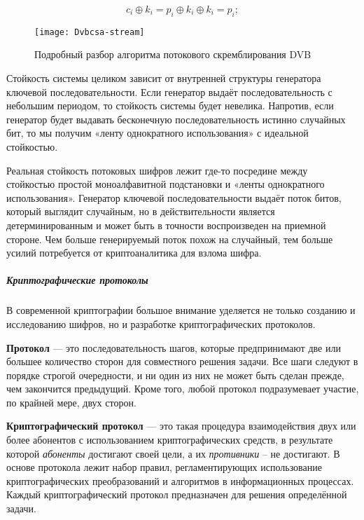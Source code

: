 \begin{equation}\label{potocShifr}
c_i \oplus k_i =p_i \oplus k_i \oplus k_i=p_i;
\end{equation}

\begin{figure}[!ht]
  \centering
  \texttt{[image: Dvbcsa-stream]}
  \caption{Подробный разбор алгоритма потокового скремблирования DVB }\label{Dvbcsa_stream}
\end{figure}
Стойкость системы целиком зависит от внутренней структуры генератора ключевой
последовательности. Если генератор выдаёт последовательность с небольшим
периодом, то стойкость системы будет невелика. Напротив, если генератор будет
выдавать бесконечную последовательность истинно случайных бит, то мы получим
«ленту однократного использования» с идеальной стойкостью.

Реальная стойкость потоковых шифров лежит где-то посредине между стойкостью
простой моноалфавитной подстановки и «ленты однократного использования».
Генератор ключевой последовательности выдаёт поток битов, который выглядит
случайным, но в действительности является детерминированным и может быть в
точности воспроизведен на приемной стороне. Чем больше генерируемый поток
похож на случайный, тем больше усилий потребуется от криптоаналитика для
взлома шифра.

\subparagraph{Криптографические протоколы} %
В современной криптографии большое внимание уделяется не только созданию и
исследованию шифров, но и разработке криптографических протоколов.

\textbf{Протокол} --- это последовательность шагов, которые предпринимают две
или большее количество сторон для совместного решения задачи. Все шаги
следуют в порядке строгой очередности, и ни один из них не может быть сделан
прежде, чем закончится предыдущий. Кроме того, любой протокол подразумевает
участие, по крайней мере, двух сторон.

\textbf{Криптографический протокол} --- это такая процедура взаимодействия
двух или более абонентов с использованием криптографических средств, в
результате которой \emph{абоненты} достигают своей цели, а их
\emph{противники} -- не достигают. В основе протокола лежит набор правил,
регламентирующих использование криптографических преобразований и алгоритмов
в информационных процессах. Каждый криптографический протокол предназначен
для решения определённой задачи.

